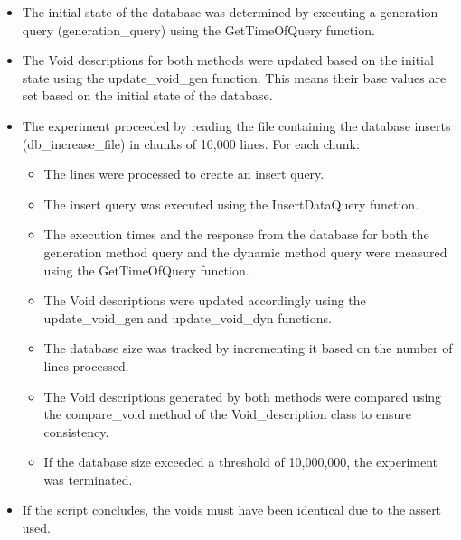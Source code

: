 \begin{itemize}
    \item The initial state of the database was determined by executing a generation query (generation_query) using the GetTimeOfQuery function.
    
    \item The Void descriptions for both methods were updated based on the initial state using the update_void_gen function. This means their base values are set based on the initial state of the database.
    
    \item The experiment proceeded by reading the file containing the database inserts (db_increase_file) in chunks of 10,000 lines. For each chunk:
    
    \begin{itemize}
        \item The lines were processed to create an insert query.
        
        \item The insert query was executed using the InsertDataQuery function.
        
        \item The execution times and the response from the database for both the generation method query and the dynamic method query were measured using the GetTimeOfQuery function.
        
        \item The Void descriptions were updated accordingly using the update_void_gen and update_void_dyn functions.
        
        \item The database size was tracked by incrementing it based on the number of lines processed.
        
        \item The Void descriptions generated by both methods were compared using the compare_void method of the Void_description class to ensure consistency.
        
        \item If the database size exceeded a threshold of 10,000,000, the experiment was terminated.
    \end{itemize}
    
    \item If the script concludes, the voids must have been identical due to the assert used.
\end{itemize}



